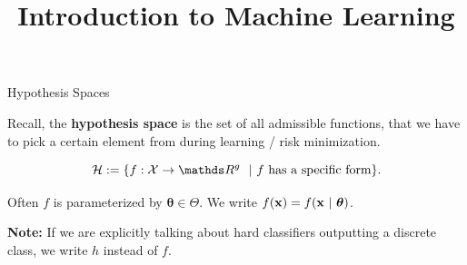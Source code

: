 \documentclass[11pt,compress,t,notes=noshow, xcolor=table]{beamer}
\title{Introduction to Machine Learning}
\date{}
\begin{document}

\begin{vbframe} {Hypothesis Spaces}

    Recall, the \textbf{hypothesis space} is the set of all admissible functions, that we have to pick a certain element from during learning / risk minimization.

$$
\Hspace := \{f: \Xspace \to \R^g ~~|~ f \text{ has a specific form}\}. 
$$

Often $f$ is parameterized by $\bm{\theta} \in \Theta$. We write $f(\mathbf{x}) = f(\mathbf{x} ~|~ \bm{\theta})$. 

\lz 

\textbf{Note:} If we are explicitly talking about hard classifiers outputting a discrete class, we write $h$ instead of $f$. 


%
\end{vbframe}
\end{document}
